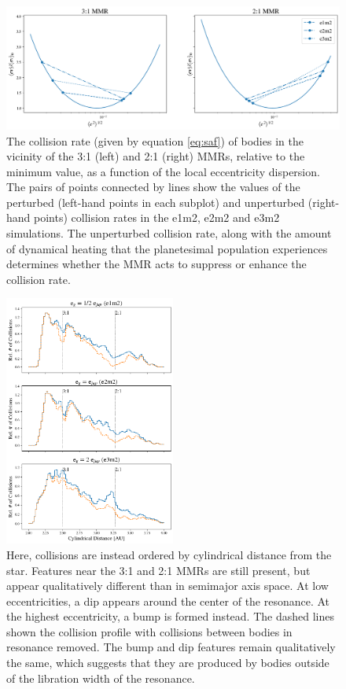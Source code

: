 \documentclass[fleqn,usenatbib]{mnras}
\begin{document}
\begin{figure}
\begin{center}
    \includegraphics[width=\textwidth]{figures/gf_plot.png}
    \caption{The collision rate (given by equation \ref{eq:saf}) of bodies in the vicinity of the 3:1 (left) and 2:1 (right) MMRs, relative to the minimum value, as a function of the local 
    eccentricity dispersion. The pairs of points connected by lines show the values of the perturbed (left-hand points in each subplot) and unperturbed (right-hand points) collision rates in 
    the e1m2, e2m2 and e3m2 simulations. The unperturbed collision rate, along with the amount of dynamical heating that the planetesimal population experiences determines whether 
    the MMR acts to suppress or enhance the collision rate.\label{fig:gf}}
\end{center}
\end{figure}

\begin{figure}
\begin{center}
    \includegraphics[width=0.5\textwidth]{figures/coll_hist_r.png}
    \caption{Here, collisions are instead ordered by cylindrical distance from the star. Features near the 3:1 and 2:1 MMRs are still present, but appear qualitatively different than in 
    semimajor axis space. At low eccentricities, a dip appears around the center of the resonance. At the highest eccentricity, a bump is formed instead. The dashed lines shown the 
    collision profile with collisions between bodies in resonance removed. The bump and dip features remain qualitatively the same, which suggests that they are produced by bodies 
    outside of the libration width of the resonance.\label{fig:coll_hist_r}}
\end{center}
\end{figure}
\end{document}
